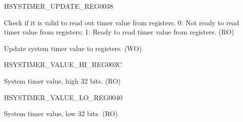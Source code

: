 \begin{register}{H}{SYSTIMER\_UPDATE\_REG}{\hexprefix{}0038}\label{regdesc:SYSTIMERUPDATEREG}
%
%
%
\regnewline%
\begin{regdesc}\begin{reglist}
\label{fielddesc:SYSTIMERTIMERVALUEVALID}\item [SYSTIMER\_TIMER\_VALUE\_VALID] Check if it is valid to read out timer value from registers. 0: Not ready to read timer value from registers; 1: Ready to read timer value from registers. (RO)
\label{fielddesc:SYSTIMERTIMERUPDATE}\item [SYSTIMER\_TIMER\_UPDATE] Update system timer value to registers. (WO)
\end{reglist}\end{regdesc}
\end{register}


\begin{register}{H}{SYSTIMER\_VALUE\_HI\_REG}{\hexprefix{}003C}\label{regdesc:SYSTIMERVALUEHIREG}
%
\regnewline%
\begin{regdesc}\begin{reglist}
\label{fielddesc:SYSTIMERTIMERVALUEHI}\item [SYSTIMER\_TIMER\_VALUE\_HI] System timer value, high 32 bits. (RO)
\end{reglist}\end{regdesc}
\end{register}


\begin{register}{H}{SYSTIMER\_VALUE\_LO\_REG}{\hexprefix{}0040}\label{regdesc:SYSTIMERVALUELOREG}
%
\regnewline%
\begin{regdesc}\begin{reglist}
\label{fielddesc:SYSTIMERTIMERVALUELO}\item [SYSTIMER\_TIMER\_VALUE\_LO] System timer value, low 32 bits. (RO)
\end{reglist}\end{regdesc}
\end{register}



